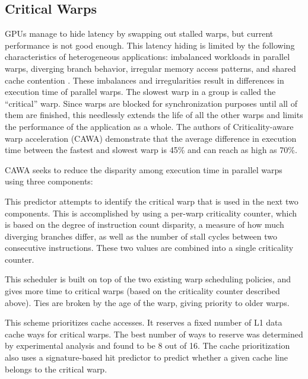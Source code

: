 \documentclass[prodmode,acmtecs]{acmsmall} %
\begin{document}
\subsection{Critical Warps}
GPUs manage to hide latency by swapping out stalled warps, but current
performance is not good enough. This latency hiding is limited by the following
characteristics of heterogeneous applications: imbalanced workloads in parallel
warps, diverging branch behavior, irregular memory access patterns, and shared
cache contention \cite{CoordinatedWarpScheduling}. These imbalances and
irregularities result in differences in execution time of parallel warps. The
slowest warp in a group is called the ``critical'' warp. Since warps are blocked
for synchronization purposes until all of them are finished, this needlessly
extends the life of all the other warps and limits the performance of the
application as a whole. The authors of Criticality-aware warp acceleration
(CAWA) demonstrate that the average difference in execution time between the
fastest and slowest warp is 45\% and can reach as high as 70\%.

CAWA seeks to reduce the disparity among execution time in parallel warps using
three components:
\begin{description}
  \setlength\itemsep{0.5em}
  \item[Dynamic warp criticality prediction] This predictor attempts to identify
  the critical warp that is used in the next two components. This is
  accomplished by using a per-warp criticality counter, which is based on the
  degree of instruction count disparity, a measure of how much diverging
  branches differ, as well as the number of stall cycles between two consecutive
  instructions. These two values are combined into a single criticality counter.
  \item[A greedy criticality-aware warp scheduler] This scheduler is built on
  top of the two existing warp scheduling policies, and gives more time to
  critical warps (based on the criticality counter described above). Ties are
  broken by the age of the warp, giving priority to older warps.
  \item[Criticality-aware cache prioritization] This scheme prioritizes cache
  accesses. It reserves a fixed number of L1 data cache ways for critical warps.
  The best number of ways to reserve was determined by experimental analysis and
  found to be 8 out of 16. The cache prioritization also uses a signature-based
  hit predictor to predict whether a given cache line belongs to the critical
  warp.
\end{description}
\end{document}
